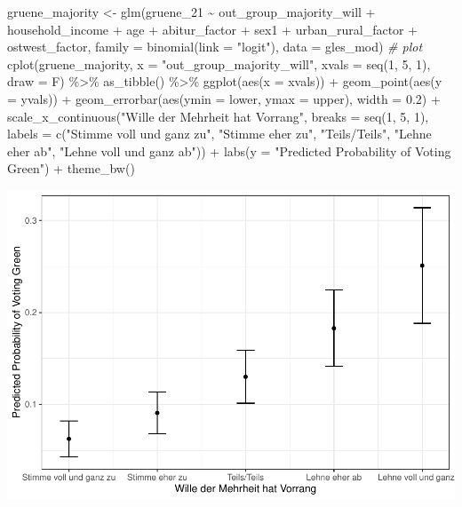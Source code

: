 \documentclass[
]{article}
\newenvironment{Shaded}{\begin{snugshade}}{\end{snugshade}}
\newcommand{\AttributeTok}[1]{\textcolor[rgb]{0.77,0.63,0.00}{#1}}
\newcommand{\CommentTok}[1]{\textcolor[rgb]{0.56,0.35,0.01}{\textit{#1}}}
\newcommand{\DecValTok}[1]{\textcolor[rgb]{0.00,0.00,0.81}{#1}}
\newcommand{\FloatTok}[1]{\textcolor[rgb]{0.00,0.00,0.81}{#1}}
\newcommand{\FunctionTok}[1]{\textcolor[rgb]{0.00,0.00,0.00}{#1}}
\newcommand{\NormalTok}[1]{#1}
\newcommand{\OtherTok}[1]{\textcolor[rgb]{0.56,0.35,0.01}{#1}}
\newcommand{\SpecialCharTok}[1]{\textcolor[rgb]{0.00,0.00,0.00}{#1}}
\newcommand{\StringTok}[1]{\textcolor[rgb]{0.31,0.60,0.02}{#1}}
\begin{document}
\begin{Shaded}
\begin{Highlighting}[]
\NormalTok{gruene\_majority }\OtherTok{\textless{}{-}} \FunctionTok{glm}\NormalTok{(gruene\_21 }\SpecialCharTok{\textasciitilde{}}\NormalTok{ out\_group\_majority\_will }\SpecialCharTok{+}\NormalTok{ household\_income }\SpecialCharTok{+}\NormalTok{ age }\SpecialCharTok{+}\NormalTok{ abitur\_factor }\SpecialCharTok{+}\NormalTok{ sex1 }\SpecialCharTok{+}\NormalTok{ urban\_rural\_factor }\SpecialCharTok{+}\NormalTok{ ostwest\_factor, }\AttributeTok{family =} \FunctionTok{binomial}\NormalTok{(}\AttributeTok{link =} \StringTok{"logit"}\NormalTok{), }\AttributeTok{data =}\NormalTok{ gles\_mod)}
\CommentTok{\# plot }
\FunctionTok{cplot}\NormalTok{(gruene\_majority, }\AttributeTok{x =} \StringTok{"out\_group\_majority\_will"}\NormalTok{, }
      \AttributeTok{xvals =} \FunctionTok{seq}\NormalTok{(}\DecValTok{1}\NormalTok{, }\DecValTok{5}\NormalTok{, }\DecValTok{1}\NormalTok{), }\AttributeTok{draw =}\NormalTok{ F) }\SpecialCharTok{\%\textgreater{}\%}
  \FunctionTok{as\_tibble}\NormalTok{() }\SpecialCharTok{\%\textgreater{}\%}
  \FunctionTok{ggplot}\NormalTok{(}\FunctionTok{aes}\NormalTok{(}\AttributeTok{x =}\NormalTok{ xvals)) }\SpecialCharTok{+}
  \FunctionTok{geom\_point}\NormalTok{(}\FunctionTok{aes}\NormalTok{(}\AttributeTok{y =}\NormalTok{ yvals)) }\SpecialCharTok{+}
  \FunctionTok{geom\_errorbar}\NormalTok{(}\FunctionTok{aes}\NormalTok{(}\AttributeTok{ymin =}\NormalTok{ lower, }\AttributeTok{ymax =}\NormalTok{ upper), }\AttributeTok{width =} \FloatTok{0.2}\NormalTok{) }\SpecialCharTok{+}
  \FunctionTok{scale\_x\_continuous}\NormalTok{(}\StringTok{"Wille der Mehrheit hat Vorrang"}\NormalTok{, }
                     \AttributeTok{breaks =} \FunctionTok{seq}\NormalTok{(}\DecValTok{1}\NormalTok{, }\DecValTok{5}\NormalTok{, }\DecValTok{1}\NormalTok{),}
                     \AttributeTok{labels =} \FunctionTok{c}\NormalTok{(}\StringTok{"Stimme voll und ganz zu"}\NormalTok{, }\StringTok{"Stimme eher zu"}\NormalTok{, }
                                \StringTok{"Teils/Teils"}\NormalTok{, }\StringTok{"Lehne eher ab"}\NormalTok{, }
                                \StringTok{"Lehne voll und ganz ab"}\NormalTok{)) }\SpecialCharTok{+}
  \FunctionTok{labs}\NormalTok{(}\AttributeTok{y =} \StringTok{"Predicted Probability of Voting Green"}\NormalTok{) }\SpecialCharTok{+}
  \FunctionTok{theme\_bw}\NormalTok{()}
\end{Highlighting}
\end{Shaded}

\includegraphics{AVCD_Final_Assignment-Edenhofer_files/figure-latex/gruene-majority-will-1.pdf}
\end{document}
